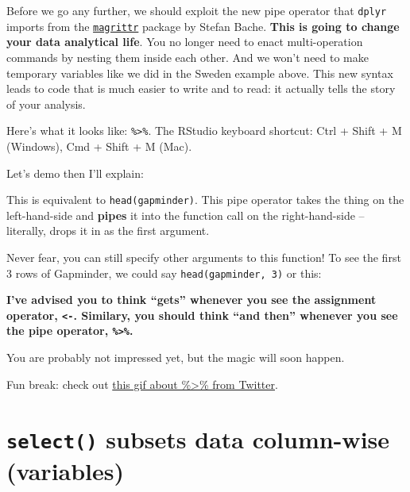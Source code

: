 \documentclass[]{book}
\newenvironment{Shaded}{\begin{snugshade}}{\end{snugshade}}
\newcommand{\KeywordTok}[1]{\textcolor[rgb]{0.13,0.29,0.53}{\textbf{{#1}}}}
\newcommand{\DecValTok}[1]{\textcolor[rgb]{0.00,0.00,0.81}{{#1}}}
\newcommand{\StringTok}[1]{\textcolor[rgb]{0.31,0.60,0.02}{{#1}}}
\newcommand{\NormalTok}[1]{{#1}}
\theoremstyle{definition}
\theoremstyle{definition}
\theoremstyle{definition}
\theoremstyle{remark}
\begin{document}
Before we go any further, we should exploit the new pipe operator that
\texttt{dplyr} imports from the
\href{https://github.com/smbache/magrittr}{\texttt{magrittr}} package by
Stefan Bache. \textbf{This is going to change your data analytical
life}. You no longer need to enact multi-operation commands by nesting
them inside each other. And we won't need to make temporary variables
like we did in the Sweden example above. This new syntax leads to code
that is much easier to write and to read: it actually tells the story of
your analysis.

Here's what it looks like: \texttt{\%\textgreater{}\%}. The RStudio
keyboard shortcut: Ctrl + Shift + M (Windows), Cmd + Shift + M (Mac).

Let's demo then I'll explain:

\begin{Shaded}
\end{Shaded}

This is equivalent to \texttt{head(gapminder)}. This pipe operator takes
the thing on the left-hand-side and \textbf{pipes} it into the function
call on the right-hand-side -- literally, drops it in as the first
argument.

Never fear, you can still specify other arguments to this function! To
see the first 3 rows of Gapminder, we could say
\texttt{head(gapminder,\ 3)} or this:

\begin{Shaded}
\end{Shaded}

\textbf{I've advised you to think ``gets'' whenever you see the
assignment operator, \texttt{\textless{}-}. Similary, you should think
``and then'' whenever you see the pipe operator,
\texttt{\%\textgreater{}\%}.}

You are probably not impressed yet, but the magic will soon happen.

Fun break: check out
\href{https://twitter.com/backerman150/status/926479565869993984}{this
gif about \%\textgreater{}\% from Twitter}.

\section{\texorpdfstring{\texttt{select()} subsets data column-wise
(variables)}{select() subsets data column-wise (variables)}}\label{select-subsets-data-column-wise-variables}
\end{document}
